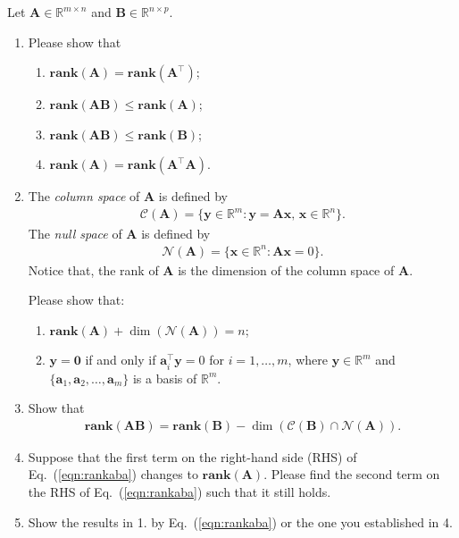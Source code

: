 \documentclass[11pt,letter,notitlepage]{article}
\renewcommand{\eqref}[1]{Eq.~(\ref{#1})}
\newcommand{\rank}[1]{ \textbf{rank}  (#1)  }
\begin{document}
\begin{exercise}
    Let $\mathbf{A} \in \mathbb{R}^{m\times n}$ and $\mathbf{B}\in \mathbb{R}^{n\times p}$.
    \begin{enumerate}
        \item Please show that
              \begin{enumerate}
                  \item $\rank{\mathbf{A}} = \rank{\mathbf{A}^{\top}}$;
                  \item $\rank{\mathbf{A}\mathbf{B}} \leq \rank{\mathbf{A}}$;
                  \item $\rank{\mathbf{A}\mathbf{B}} \leq \rank{\mathbf{B}}$;
                  \item $\rank{\mathbf{A}} = \rank{\mathbf{A}^{\top}  \mathbf{A}}$.
              \end{enumerate}
        \item The \emph{column space} of $\mathbf{A}$ is defined by
              \begin{align*}
                  \mathcal{C}(\mathbf{A} ) = \{ \mathbf{y}\in \mathbb{R}^m : \mathbf{y} = \mathbf{Ax},\,\mathbf{x}\in\mathbb{R}^n\}.
              \end{align*}
              The \emph{null space} of $\mathbf{A}$ is defined by
              \begin{align*}
                  \mathcal{N}(\mathbf{A})  = \{ \mathbf{x}\in \mathbb{R}^n : \mathbf{Ax}=0\}.
              \end{align*}
              Notice that, the rank of $\mathbf{A}$ is the dimension of the column space of $\mathbf{A}$.

              Please show that:
              \begin{enumerate}
                  \item $\rank{\mathbf{A}} + \dim ( \mathcal{N}( \mathbf{A} ) ) = n$;
                  \item $\mathbf{y}=\mathbf{0}$ if and only if $\mathbf{a}_i^{\top}\mathbf{y}=0$ for $i=1,\ldots,m$, where $\mathbf{y}\in \mathbb{R}^m$ and  $\{\mathbf{a}_1,\mathbf{a}_2,\ldots,\mathbf{a}_m\}$ is a basis of $\mathbb{R}^m$.
              \end{enumerate}
        \item Show that
              \begin{align}\label{eqn:rankaba}
                  \rank{\mathbf{AB}}=\rank{\mathbf{B}}-\dim(\mathcal{C}(\mathbf{B})\cap \mathcal{N}(\mathbf{A})).
              \end{align}
        \item Suppose that the first term on the right-hand side (RHS) of \eqref{eqn:rankaba} changes to $\rank{\mathbf{A}}$. Please find the second term on the RHS of \eqref{eqn:rankaba} such that it still holds.
        \item Show the results in 1. by \eqref{eqn:rankaba} or the one you established in 4.
    \end{enumerate}
\end{exercise}
\end{document}
